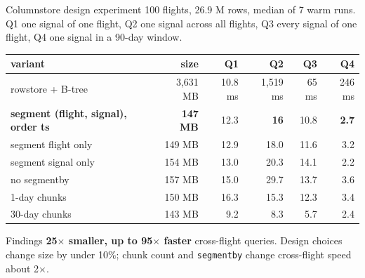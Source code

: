 \documentclass[aspectratio=169,10pt]{beamer}
\newcommand{\code}[1]{\texttt{\footnotesize #1}}
\begin{document}
\begin{frame}[shrink=5]{Columnstore design experiment}
\centering
{\scriptsize 100 flights, 26.9 M rows, median of 7 warm runs. Q1 one signal of one flight, Q2 one signal across all flights, Q3 every signal of one flight, Q4 one signal in a 90-day window.}\par\vspace{0.3em}
\begin{tabular}{@{}lrrrrr@{}}
\toprule
variant & size & Q1 & Q2 & Q3 & Q4\\
\midrule
rowstore + B-tree & 3,631 MB & 10.8 ms & 1,519 ms & 65 ms & 246 ms\\
\textbf{segment (flight, signal), order ts} & \textbf{147 MB} & 12.3 & \textbf{16} & 10.8 & \textbf{2.7}\\
segment flight only & 149 MB & 12.9 & 18.0 & 11.6 & 3.2\\
segment signal only & 154 MB & 13.0 & 20.3 & 14.1 & 2.2\\
no segmentby & 157 MB & 15.0 & 29.7 & 13.7 & 3.6\\
1-day chunks & 150 MB & 16.3 & 15.3 & 12.3 & 3.4\\
30-day chunks & 143 MB & 9.2 & 8.3 & 5.7 & 2.4\\
\bottomrule
\end{tabular}\par\vspace{0.5em}
\begin{block}{Findings}
\textbf{25$\times$ smaller, up to 95$\times$ faster} cross-flight queries. Design choices change size by under 10\%; chunk count and \code{segmentby} change cross-flight speed about 2$\times$.
\end{block}
\end{frame}
\end{document}
